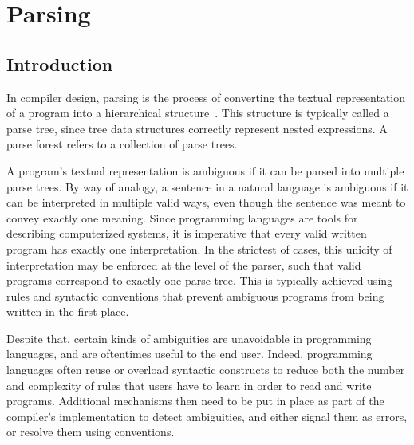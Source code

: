 \chapter{Parsing}

\section{Introduction}


In compiler design, parsing is the process of converting the textual representation of a program into a hierarchical structure~\cite{aho2007compilers, afroozeh2019practical}.
This structure is typically called a parse tree, since tree data structures correctly represent nested expressions.
A parse forest refers to a collection of parse trees.


A program's textual representation is ambiguous if it can be parsed into multiple parse trees.
By way of analogy, a sentence in a natural language is ambiguous if it can be interpreted in multiple valid ways, even though the sentence was meant to convey exactly one meaning.
Since programming languages are tools for describing computerized systems, it is imperative that every valid written program has exactly one interpretation.
In the strictest of cases, this unicity of interpretation may be enforced at the level of the parser, such that valid programs correspond to exactly one parse tree.
This is typically achieved using rules and syntactic conventions that prevent ambiguous programs from being written in the first place.

Despite that, certain kinds of ambiguities are unavoidable in programming languages, and are oftentimes useful to the end user.
Indeed, programming languages often reuse or overload syntactic constructs to reduce both the number and complexity of rules that users have to learn in order to read and write programs.
Additional mechanisms then need to be put in place as part of the compiler's implementation to detect ambiguities, and either signal them as errors, or resolve them using conventions.


